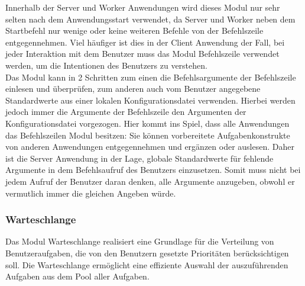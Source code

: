 \documentclass[a4paper,12pt]{article}
\begin{document}
Innerhalb der Server und Worker Anwendungen wird dieses Modul nur sehr selten nach dem Anwendungsstart verwendet, da Server und Worker neben dem Startbefehl nur wenige oder keine weiteren Befehle von der Befehlszeile entgegennehmen. Viel häufiger ist dies in der Client Anwendung der Fall, bei jeder Interaktion mit dem Benutzer muss das Modul Befehlszeile verwendet werden, um die Intentionen des Benutzers zu verstehen.\\ 

Das Modul kann in 2 Schritten zum einen die Befehlsargumente der Befehlszeile einlesen und überprüfen, zum anderen auch vom Benutzer angegebene Standardwerte aus einer lokalen Konfigurationsdatei verwenden. Hierbei werden jedoch immer die Argumente der Befehlszeile den Argumenten der Konfigurationsdatei vorgezogen. Hier kommt ins Spiel, dass alle Anwendungen das Befehlszeilen Modul besitzen: Sie können vorbereitete Aufgabenkonstrukte von anderen Anwendungen entgegennehmen und ergänzen oder auslesen. Daher ist die Server Anwendung in der Lage, globale Standardwerte für fehlende Argumente in dem Befehlsaufruf des Benutzers einzusetzen. Somit muss nicht bei jedem Aufruf der Benutzer daran denken, alle Argumente anzugeben, obwohl er vermutlich immer die gleichen Angeben würde.

\clearpage
\subsubsection{Warteschlange}
Das Modul Warteschlange realisiert eine Grundlage für die Verteilung von Benutzeraufgaben, die von den Benutzern gesetzte Prioritäten berücksichtigen soll. Die Warteschlange ermöglicht eine effiziente Auswahl der auszuführenden Aufgaben aus dem Pool aller Aufgaben.\\
\end{document}
